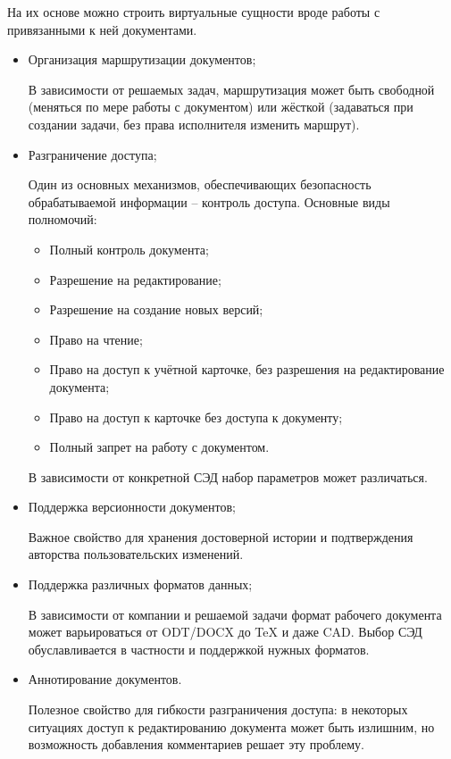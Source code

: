 \vspace{\baselineskip}
На их основе можно строить виртуальные сущности вроде работы с привязанными к ней документами.
\begin{itemize}
	\item Организация маршрутизации документов;

	В зависимости от решаемых задач, маршрутизация может быть свободной (меняться по мере работы с документом) или жёсткой (задаваться при создании задачи, без права исполнителя изменить маршрут).
	\item Разграничение доступа;

	Один из основных механизмов, обеспечивающих безопасность обрабатываемой информации – контроль доступа. Основные виды полномочий:
	\begin{itemize}
		\item Полный контроль документа;
		\item Разрешение на редактирование;
		\item Разрешение на создание новых версий;
		\item Право на чтение;
		\item Право на доступ к учётной карточке, без разрешения на редактирование документа;
		\item Право на доступ к карточке без доступа к документу;
		\item Полный запрет на работу с документом.
	\end{itemize}
	В зависимости от конкретной СЭД набор параметров может различаться.
	\item Поддержка версионности документов;

	Важное свойство для хранения достоверной истории и подтверждения авторства пользовательских изменений.
	\item Поддержка различных форматов данных;

	В зависимости от компании и решаемой задачи формат рабочего документа может варьироваться от ODT/DOCX до TeX и даже CAD. Выбор СЭД обуславливается в частности и поддержкой нужных форматов.
	\item Аннотирование документов.

	Полезное свойство для гибкости разграничения доступа: в некоторых ситуациях доступ к редактированию документа может быть излишним, но возможность добавления комментариев решает эту проблему.
\end{itemize}

